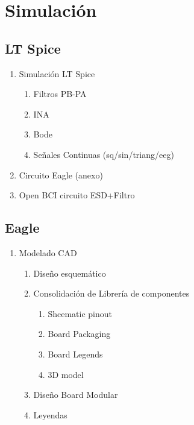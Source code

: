 \documentclass[11pt]{article}
\begin{document}
\section{Simulación}
\label{sec:org6d1d943}
\subsection{LT Spice}
\label{sec:orge5de4b7}
\begin{enumerate}
\item Simulación LT Spice\\
\begin{enumerate}
\item Filtros PB-PA\\
\item INA\\
\item Bode\\
\item Señales Continuas (sq/sin/triang/eeg)\\
\end{enumerate}
\item Circuito Eagle (anexo)\\
\item Open BCI circuito ESD+Filtro\\
\end{enumerate}
\subsection{Eagle}
\label{sec:org5634379}
\begin{enumerate}
\item Modelado CAD\\
\begin{enumerate}
\item Diseño esquemático\\
\item Consolidación de Librería de componentes\\
\begin{enumerate}
\item Shcematic pinout\\
\item Board Packaging\\
\item Board Legends\\
\item 3D model\\
\end{enumerate}
\item Diseño Board Modular\\
\item Leyendas\\
\end{enumerate}
\end{enumerate}
\end{document}
